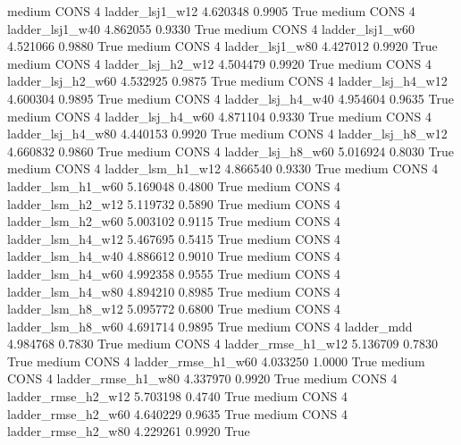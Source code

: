     medium     CONS                 4        ladder_lsj1_w12   4.620348      0.9905    True
    medium     CONS                 4        ladder_lsj1_w40   4.862055      0.9330    True
    medium     CONS                 4        ladder_lsj1_w60   4.521066      0.9880    True
    medium     CONS                 4        ladder_lsj1_w80   4.427012      0.9920    True
    medium     CONS                 4      ladder_lsj_h2_w12   4.504479      0.9920    True
    medium     CONS                 4      ladder_lsj_h2_w60   4.532925      0.9875    True
    medium     CONS                 4      ladder_lsj_h4_w12   4.600304      0.9895    True
    medium     CONS                 4      ladder_lsj_h4_w40   4.954604      0.9635    True
    medium     CONS                 4      ladder_lsj_h4_w60   4.871104      0.9330    True
    medium     CONS                 4      ladder_lsj_h4_w80   4.440153      0.9920    True
    medium     CONS                 4      ladder_lsj_h8_w12   4.660832      0.9860    True
    medium     CONS                 4      ladder_lsj_h8_w60   5.016924      0.8030    True
    medium     CONS                 4      ladder_lsm_h1_w12   4.866540      0.9330    True
    medium     CONS                 4      ladder_lsm_h1_w60   5.169048      0.4800    True
    medium     CONS                 4      ladder_lsm_h2_w12   5.119732      0.5890    True
    medium     CONS                 4      ladder_lsm_h2_w60   5.003102      0.9115    True
    medium     CONS                 4      ladder_lsm_h4_w12   5.467695      0.5415    True
    medium     CONS                 4      ladder_lsm_h4_w40   4.886612      0.9010    True
    medium     CONS                 4      ladder_lsm_h4_w60   4.992358      0.9555    True
    medium     CONS                 4      ladder_lsm_h4_w80   4.894210      0.8985    True
    medium     CONS                 4      ladder_lsm_h8_w12   5.095772      0.6800    True
    medium     CONS                 4      ladder_lsm_h8_w60   4.691714      0.9895    True
    medium     CONS                 4             ladder_mdd   4.984768      0.7830    True
    medium     CONS                 4     ladder_rmse_h1_w12   5.136709      0.7830    True
    medium     CONS                 4     ladder_rmse_h1_w60   4.033250      1.0000    True
    medium     CONS                 4     ladder_rmse_h1_w80   4.337970      0.9920    True
    medium     CONS                 4     ladder_rmse_h2_w12   5.703198      0.4740    True
    medium     CONS                 4     ladder_rmse_h2_w60   4.640229      0.9635    True
    medium     CONS                 4     ladder_rmse_h2_w80   4.229261      0.9920    True
